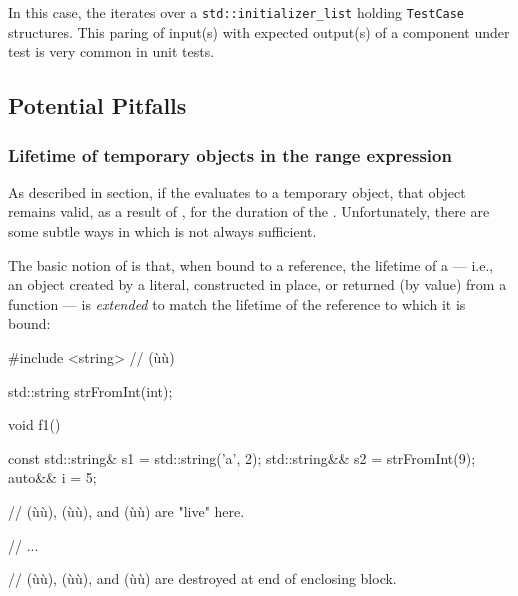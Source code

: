 {{\noindent In this case, the  iterates over a
\lstinline!std::initializer_list! holding \lstinline!TestCase! structures.
This paring of input(s) with expected output(s) of a component under
test is very common in unit tests.

\subsection[Potential Pitfalls]{Potential Pitfalls}\label{potential-pitfalls}

\subsubsection[Lifetime of temporary objects in the range expression]{Lifetime of temporary objects in the range expression}\label{lifetime-of-temporary-objects-in-the-range-expression}

As described in  section, if the  evaluates to a temporary object, that object remains valid,
as a result of , for the duration of the
. Unfortunately, there are some
subtle ways in which  is not always
sufficient.

The basic notion of  is that, when bound to a
reference, the lifetime of a  --- i.e., an object
created by a literal, constructed in place, or returned (by value) from
a function --- is \emph{extended} to match the lifetime of the reference
to which it is bound:

\begin{emcppslisting}[emcppsbatch=e3]
#include <string>  // (ù{}ù)

std::string strFromInt(int);

void f1()
{
    const std::string& s1 = std::string('a', 2);
    std::string&&      s2 = strFromInt(9);
    auto&&             i  = 5;

    // (ù{}ù), (ù{}ù), and (ù{}ù) are "live" here.

    // ...

}  // (ù{}ù), (ù{}ù), and (ù{}ù) are destroyed at end of enclosing block.
\end{emcppslisting}


}}

